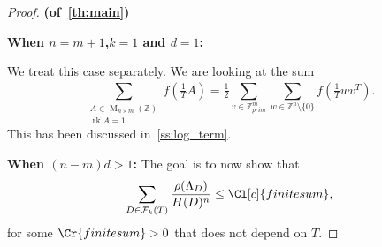 \documentclass{amsart}
\theoremstyle{definition}
\theoremstyle{remark}
\newcommand{\prim}{prim}
\DeclareMathOperator{\M}{M}
\DeclareMathOperator{\rank}{rk}
\begin{document}
\begin{proof} {\bf (of~\cref{th:main})}


    {\bf When $n=m+1$,$k=1$ and $d=1$:}
    
    We treat this case separately. We are looking at the sum
    \begin{equation}
        \sum_{\substack{A \in \M_{n \times m}(\mathbb{Z}) \\ \rank A = 1}} f(\tfrac{1}{T} A) 
        =  
        \tfrac{1}{2}\sum_{v \in \mathbb{Z}^{m}_{\prim}}^{} \sum_{w \in \mathbb{Z}^{n} \setminus \{0\} } f(\tfrac{1}{T} wv^{T}).
    \end{equation}
    This has been discussed in~\cref{ss:log_term}.
    
    {\bf When $(n-m)d > 1$:}
    The goal is to now show that 
    \begin{equation}
        \sum_{D \in \mathcal{F}_{k}(T)} \frac{\rho(\Lambda_{D})}{H(D)^{n}} \leq \Cl[c]{finitesum},
    \end{equation}
    for some $\Cr{finitesum} > 0$ that does not depend on $T$.


\end{proof}
\end{document}
